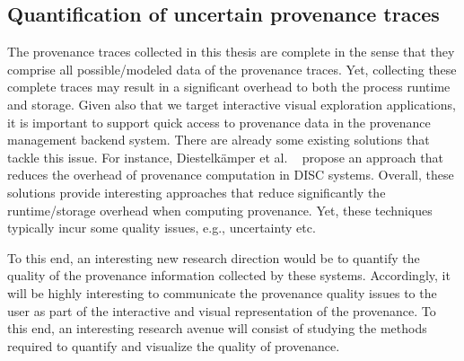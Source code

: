 \subsection{Quantification of uncertain provenance traces}
\label{sec:future2}


The provenance traces collected in this thesis are complete in the sense that they comprise all possible/modeled data of the provenance traces. 
Yet, collecting these complete traces may result in a significant overhead to both the process runtime and storage. 
Given also that we target interactive visual exploration applications, it is important to support quick access to provenance data in the provenance management backend system.
There are already some existing solutions that tackle this issue. For instance, Diestelk{\"a}mper et al.%
~\cite{diestelkamper2020} propose an approach that reduces the overhead of provenance computation in DISC systems. 
Overall, these solutions provide interesting approaches that reduce significantly the runtime/storage overhead when computing provenance. Yet, these techniques typically incur some quality issues, e.g., uncertainty etc.

To this end, an interesting new research direction would be to quantify the quality of the provenance information collected by these systems. 
Accordingly, it will be highly interesting to communicate the provenance quality issues to the user as part of the interactive and visual representation of the provenance. To this end, an interesting research avenue will consist of  studying the methods required to quantify and visualize the quality of provenance. 

